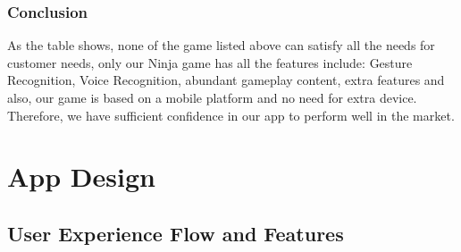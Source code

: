 \documentclass[UTF8,a4paper,12pt]{ctexart}
\numberwithin{equation}{section}
\begin{document}
\begin{table}[]
\end{table}

\subsubsection*{Conclusion}
 As the table shows, none of the game listed above can satisfy all the needs for customer needs, only our Ninja game has all the features include: Gesture Recognition, Voice Recognition, abundant gameplay content, extra features and also, our game is based on a mobile platform and no need for extra device. Therefore, we have sufficient confidence in our app to perform well in the market.


\newpage
{}
\section{App Design}
\subsection{User Experience Flow and Features}
\end{document}
